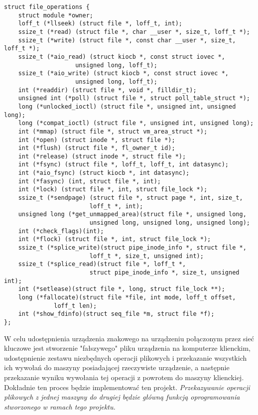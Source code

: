 \documentclass[10pt]{scrartcl}
\begin{document}
\begin{verbatim}
struct file_operations {
    struct module *owner;
    loff_t (*llseek) (struct file *, loff_t, int);
    ssize_t (*read) (struct file *, char __user *, size_t, loff_t *);
    ssize_t (*write) (struct file *, const char __user *, size_t, loff_t *);
    ssize_t (*aio_read) (struct kiocb *, const struct iovec *,
                    unsigned long, loff_t);
    ssize_t (*aio_write) (struct kiocb *, const struct iovec *,
                    unsigned long, loff_t);
    int (*readdir) (struct file *, void *, filldir_t);
    unsigned int (*poll) (struct file *, struct poll_table_struct *);
    long (*unlocked_ioctl) (struct file *, unsigned int, unsigned long);
    long (*compat_ioctl) (struct file *, unsigned int, unsigned long);
    int (*mmap) (struct file *, struct vm_area_struct *);
    int (*open) (struct inode *, struct file *);
    int (*flush) (struct file *, fl_owner_t id);
    int (*release) (struct inode *, struct file *);
    int (*fsync) (struct file *, loff_t, loff_t, int datasync);
    int (*aio_fsync) (struct kiocb *, int datasync);
    int (*fasync) (int, struct file *, int);
    int (*lock) (struct file *, int, struct file_lock *);
    ssize_t (*sendpage) (struct file *, struct page *, int, size_t,
                        loff_t *, int);
    unsigned long (*get_unmapped_area)(struct file *, unsigned long,
                        unsigned long, unsigned long, unsigned long);
    int (*check_flags)(int);
    int (*flock) (struct file *, int, struct file_lock *);
    ssize_t (*splice_write)(struct pipe_inode_info *, struct file *,
                        loff_t *, size_t, unsigned int);
    ssize_t (*splice_read)(struct file *, loff_t *,
                        struct pipe_inode_info *, size_t, unsigned int);
    int (*setlease)(struct file *, long, struct file_lock **);
    long (*fallocate)(struct file *file, int mode, loff_t offset,
              loff_t len);
    int (*show_fdinfo)(struct seq_file *m, struct file *f);
};
\end{verbatim}

W celu udostępnienia urządzenia znakowego na urządzeniu połączonym przez sieć kluczowe jest stworzenie "fałszywego" pliku urządzenia na komputerze klienckim, udostępnienie zestawu niezbędnych operacji plikowych i przekazanie wszystkich ich wywołań do maszyny posiadającej rzeczywiste urządzenie, a następnie przekazanie wyniku wywołania tej operacji z powrotem do maszyny klienckiej. Dokładnie ten proces będzie implementować ten projekt. \emph{Przekazywanie operacji plikowych z jednej maszyny do drugiej będzie główną funkcją oprogramowania stworzonego w ramach tego projektu.}
\end{document}

